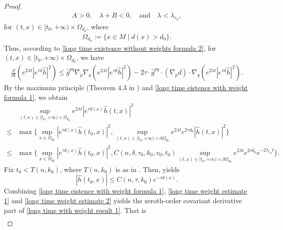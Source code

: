 \documentclass[12pt]{amsart}
\begin{document}
\begin{proof}
\begin{align*}
    A > 0, \quad \lambda + B < 0, \quad \text{and} \quad \lambda < \lambda_{\varepsilon_0},
\end{align*}
for $(t, x)\in [t_0, +\infty)\times\Omega_{d_0}$, where 
\begin{align*}
    \Omega_{d_0} := \{x\in M\; |\; d(x) > d_0\}.
\end{align*}
Thus, according to \eqref{long time existence without weights formula 2}, for $(t, x)\in [t_0, +\infty)\times\Omega_{d_0}$, we have
\begin{align}
    \frac{\partial}{\partial t} \left( e^{2\lambda t}|e^{\tau d}\hat{h}|^2 \right) 
    \leq \hat{g}^{pq} \nabla_p \nabla_q \left( e^{2\lambda t}|e^{\tau d} \hat{h}|^2 \right) - 2\tau \cdot \hat{g}^{pq} \cdot (\nabla_p d) \cdot \nabla_q \left( e^{2\lambda t} |e^{\tau d}\hat{h}|^2 \right).
\end{align}
By the maximum principle (Theorem 4.3 in \cite{QSW2013}) and \eqref{long time eistence with weight formula 1}, we obtain 
\begin{equation}\label{long time weight estimate 1}
    \begin{split}
        &\sup_{(t, x)\in[t_0, +\infty) \times \Omega_{d_0}} e^{2\lambda t}|e^{\tau d(x)}\hat{h}(t, x)|^2 \\
        \leq& \max\Big\{\sup_{x\in\Omega_{d_0}} |e^{\tau d(x)}\hat{h}(t_0, x)|^2, \sup_{(t, x)\in[t_0, +\infty)\times \partial\Omega_{d_0}}e^{2\lambda t}e^{2\tau d_0}|\hat{h}(t, x)|^2\Big\}\\
        \leq& \max\Big\{\sup_{x\in\Omega_{d_0}} |e^{\tau d(x)}\hat{h}(t_0, x)|^2, C(n, \delta, \tau_0, k_0, v_0, t_0)\sup_{(t, x)\in[t_0, +\infty)\times \partial\Omega_{d_0}}e^{2\lambda t}e^{2\tau d_0} e^{-2 \lambda_{\varepsilon_0} t}\Big\}.
    \end{split}
\end{equation}
Fix $t_0 < T(n,k_0)$, where $T(n,k_0)$ is as in . Then,  yields
\begin{equation}\label{long time weight estimate 2}
    |\hat{h}(t_0,x)| \leq C(n,\tau,k_0) e^{-\tau d(x)}.
\end{equation}
Combining \eqref{long time eistence with weight formula 1}, \eqref{long time weight estimate 1} and \eqref{long time weight estimate 2} yields the zeroth-order covariant derivative part of \eqref{long time with weight result 1}. That is 
\begin{align}\label{long time existence with weight formula 4}

\end{align}
\end{proof}
\end{document}
